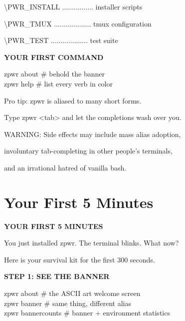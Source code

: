 \documentclass[11pt,a4paper,twoside]{book}
\begin{document}
\textbackslash{}PWR\_INSTALL ................ installer scripts

\textbackslash{}PWR\_TMUX ................... tmux configuration

\textbackslash{}PWR\_TEST ................... test suite


\vspace{12pt}
{\bfseries\color{neonyellow} YOUR FIRST COMMAND}\vspace{4pt}

\begin{codebox}
zpwr about    \# behold the banner\\
zpwr help     \# list every verb in color\\
\end{codebox}

Pro tip: zpwr is aliased to many short forms.

\begin{codebox}
Type zpwr <tab> and let the completions wash over you.\\
\end{codebox}

WARNING: Side effects may include mass alias adoption,

involuntary tab-completing in other people's terminals,

and an irrational hatred of vanilla bash.


\vspace{16pt}

\section{Your First 5 Minutes}


\vspace{10pt}
{\large\bfseries\color{neoncyan} YOUR FIRST 5 MINUTES}\vspace{6pt}

\begin{codebox}
You just installed zpwr. The terminal blinks. What now?\\
\end{codebox}

Here is your survival kit for the first 300 seconds.


\vspace{12pt}
{\bfseries\color{neonyellow} STEP 1: SEE THE BANNER}\vspace{4pt}

\begin{codebox}
zpwr about              \# the ASCII art welcome screen\\
zpwr banner             \# same thing, different alias\\
zpwr bannercounts       \# banner + environment statistics\\
\end{codebox}
\end{document}
